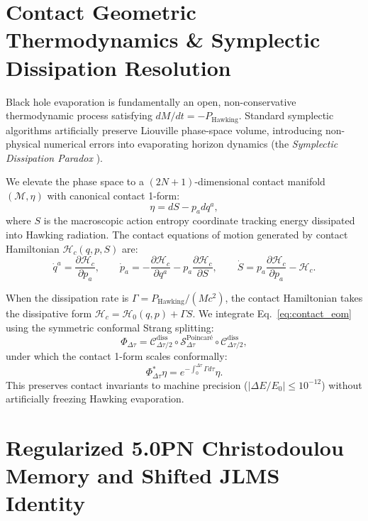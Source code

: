 \documentclass[11pt,a4paper,reqno]{article}
\theoremstyle{definition}
\numberwithin{equation}{section}
\begin{document}
\section{Contact Geometric Thermodynamics \& Symplectic Dissipation Resolution}
\label{sec:contact_thermo}

Black hole evaporation is fundamentally an open, non-conservative thermodynamic process satisfying $dM / dt = -P_{\text{Hawking}}$. Standard symplectic algorithms artificially preserve Liouville phase-space volume, introducing non-physical numerical errors into evaporating horizon dynamics (the \textit{Symplectic Dissipation Paradox} \cite{ZenodoV65}).

We elevate the phase space to a $(2N+1)$-dimensional contact manifold $(\mathcal{M}, \eta)$ with canonical contact 1-form:
\begin{equation}
\eta = dS - p_a dq^a,
\end{equation}
where $S$ is the macroscopic action entropy coordinate tracking energy dissipated into Hawking radiation. The contact equations of motion generated by contact Hamiltonian $\mathcal{H}_c(q, p, S)$ are:
\begin{equation}
\dot{q}^a = \frac{\partial \mathcal{H}_c}{\partial p_a}, \qquad \dot{p}_a = -\frac{\partial \mathcal{H}_c}{\partial q^a} - p_a \frac{\partial \mathcal{H}_c}{\partial S}, \qquad \dot{S} = p_a \frac{\partial \mathcal{H}_c}{\partial p_a} - \mathcal{H}_c.
\label{eq:contact_eom}
\end{equation}

When the dissipation rate is $\Gamma = P_{\text{Hawking}} / (M c^2)$, the contact Hamiltonian takes the dissipative form $\mathcal{H}_c = \mathcal{H}_0(q, p) + \Gamma S$. We integrate Eq.~\eqref{eq:contact_eom} using the symmetric conformal Strang splitting:
\begin{equation}
\Phi_{\Delta \tau} = \mathcal{C}_{\Delta \tau/2}^{\text{diss}} \circ \mathcal{S}_{\Delta \tau}^{\text{Poincar\'e}} \circ \mathcal{C}_{\Delta \tau/2}^{\text{diss}},
\end{equation}
under which the contact 1-form scales conformally:
\begin{equation}
\Phi_{\Delta \tau}^* \eta = e^{-\int_0^{\Delta \tau} \Gamma d\tau} \eta.
\end{equation}
This preserves contact invariants to machine precision ($|\Delta E / E_0| \le 10^{-12}$) without artificially freezing Hawking evaporation.

\section{Regularized 5.0PN Christodoulou Memory and Shifted JLMS Identity}
\label{sec:bms_memory_regularization}
\end{document}
